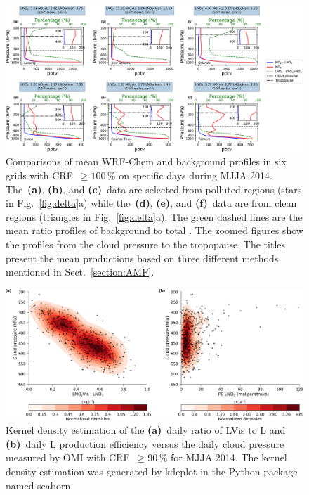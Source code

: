 \documentclass[amt]{copernicus}
\begin{document}
\begin{figure}[t]
    \includegraphics[width=17.5cm]{amt-2019-372-f07.png}
    \caption{Comparisons of mean WRF-Chem  and background  profiles in six grids with CRF~$\geq 100$\,{\%} on specific days during MJJA 2014.
    The~\textbf{(a)}, \textbf{(b)}, and \textbf{(c)}~data are selected from polluted regions (stars in Fig.~\ref{fig:delta}a) while the~\textbf{(d)}, \textbf{(e)}, and \textbf{(f)}~data are from clean regions (triangles in Fig.~\ref{fig:delta}a).
    The green dashed lines are the mean ratio profiles of background  to total .
    The zoomed figures show the profiles from the cloud pressure to the tropopause.
    The titles present the mean productions based on three different methods mentioned in Sect.~\ref{section:AMF}.}
    \label{fig:backgroundcomparisons}
\end{figure}

\begin{figure}[t]
    \includegraphics[width=15cm]{amt-2019-372-f08.png}
    \caption{Kernel density estimation of the \textbf{(a)}~daily ratio of LVis to L and \textbf{(b)}~daily L production efficiency versus the daily cloud pressure measured by OMI with CRF~$\geq 90$\,{\%} for MJJA 2014.
    The kernel density estimation was generated by kdeplot in the Python package named seaborn.}
    \label{fig:CP_ratio_LNO2}
\end{figure}
\end{document}
